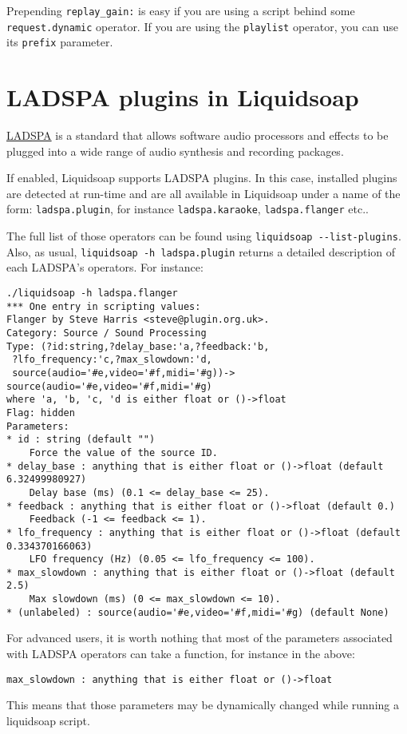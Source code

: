 Prepending \verb+replay_gain:+ is easy if you are using a script behind some
\verb+request.dynamic+ operator. If you are using the \verb+playlist+ operator,
you can use its \verb+prefix+ parameter.


\section{LADSPA plugins in Liquidsoap}
\href{http://www.ladspa.org/}{LADSPA} is a standard that allows software audio
processors and effects to be plugged into a wide range of audio synthesis and
recording packages.

If enabled, Liquidsoap supports LADSPA plugins. In this case, installed plugins
are detected at run-time and are all available in Liquidsoap under a name of the
form: \verb+ladspa.plugin+, for instance \verb+ladspa.karaoke+,
\verb+ladspa.flanger+ etc..

The full list of those operators can be found using
\verb+liquidsoap --list-plugins+.  Also, as usual,
\verb+liquidsoap -h ladspa.plugin+ returns a detailed description of each
LADSPA's operators.  For instance:

\begin{verbatim}
./liquidsoap -h ladspa.flanger
*** One entry in scripting values:
Flanger by Steve Harris <steve@plugin.org.uk>.
Category: Source / Sound Processing
Type: (?id:string,?delay_base:'a,?feedback:'b,
 ?lfo_frequency:'c,?max_slowdown:'d,
 source(audio='#e,video='#f,midi='#g))->
source(audio='#e,video='#f,midi='#g)
where 'a, 'b, 'c, 'd is either float or ()->float
Flag: hidden
Parameters:
* id : string (default "")
    Force the value of the source ID.
* delay_base : anything that is either float or ()->float (default 6.32499980927)
    Delay base (ms) (0.1 <= delay_base <= 25).
* feedback : anything that is either float or ()->float (default 0.)
    Feedback (-1 <= feedback <= 1).
* lfo_frequency : anything that is either float or ()->float (default 0.334370166063)
    LFO frequency (Hz) (0.05 <= lfo_frequency <= 100).
* max_slowdown : anything that is either float or ()->float (default 2.5)
    Max slowdown (ms) (0 <= max_slowdown <= 10).
* (unlabeled) : source(audio='#e,video='#f,midi='#g) (default None)
\end{verbatim}
For advanced users, it is worth nothing that most of the parameters associated
with LADSPA operators can take a function, for instance in the above:
\begin{verbatim}
max_slowdown : anything that is either float or ()->float
\end{verbatim}
This means that those parameters may be dynamically changed while running a
liquidsoap script.


